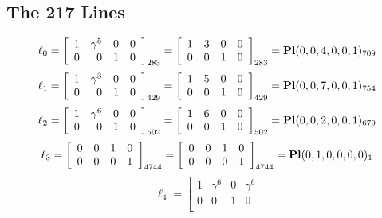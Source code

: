 \documentclass{article}
\begin{document}
{\subsection*{The 217 Lines}
$$
\ell_{0} = 
\left[
\begin{array}{*{4}{r}}
1 & \gamma^{5} & 0 & 0\\
0 & 0 & 1 & 0\\
\end{array}
\right]
_{283}
=
\left[
\begin{array}{*{4}c}
1  & 3  & 0  & 0\\
0  & 0  & 1  & 0\\
\end{array}
\right]_{283}
={\rm\bf Pl}(0,0,4,0,0,1 )_{709}$$
$$
\ell_{1} = 
\left[
\begin{array}{*{4}{r}}
1 & \gamma^{3} & 0 & 0\\
0 & 0 & 1 & 0\\
\end{array}
\right]
_{429}
=
\left[
\begin{array}{*{4}c}
1  & 5  & 0  & 0\\
0  & 0  & 1  & 0\\
\end{array}
\right]_{429}
={\rm\bf Pl}(0,0,7,0,0,1 )_{754}$$
$$
\ell_{2} = 
\left[
\begin{array}{*{4}{r}}
1 & \gamma^{6} & 0 & 0\\
0 & 0 & 1 & 0\\
\end{array}
\right]
_{502}
=
\left[
\begin{array}{*{4}c}
1  & 6  & 0  & 0\\
0  & 0  & 1  & 0\\
\end{array}
\right]_{502}
={\rm\bf Pl}(0,0,2,0,0,1 )_{679}$$
$$
\ell_{3} = 
\left[
\begin{array}{*{4}{r}}
0 & 0 & 1 & 0\\
0 & 0 & 0 & 1\\
\end{array}
\right]
_{4744}
=
\left[
\begin{array}{*{4}c}
0  & 0  & 1  & 0\\
0  & 0  & 0  & 1\\
\end{array}
\right]_{4744}
={\rm\bf Pl}(0,1,0,0,0,0 )_{1}$$
$$
\ell_{4} = 
\left[
\begin{array}{*{4}{r}}
1 & \gamma^{6} & 0 & \gamma^{6}\\
0 & 0 & 1 & 0\\

\end{array}$$}
\end{document}
